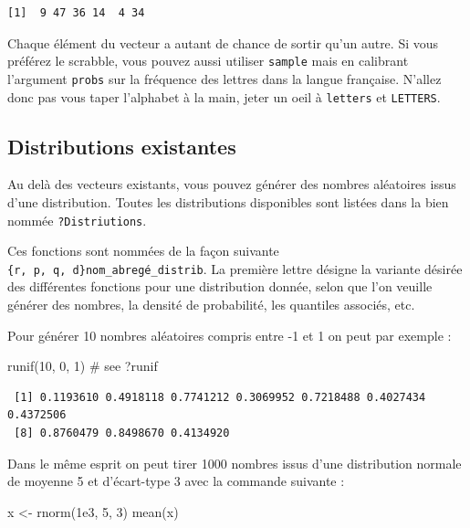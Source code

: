 \documentclass[
  letterpaper,
  DIV=11,
  numbers=noendperiod]{scrreprt}
\newenvironment{Shaded}{\begin{snugshade}}{\end{snugshade}}
\newcommand{\CommentTok}[1]{\textcolor[rgb]{0.37,0.37,0.37}{#1}}
\newcommand{\DecValTok}[1]{\textcolor[rgb]{0.68,0.00,0.00}{#1}}
\newcommand{\FloatTok}[1]{\textcolor[rgb]{0.68,0.00,0.00}{#1}}
\newcommand{\FunctionTok}[1]{\textcolor[rgb]{0.28,0.35,0.67}{#1}}
\newcommand{\NormalTok}[1]{\textcolor[rgb]{0.00,0.23,0.31}{#1}}
\newcommand{\OtherTok}[1]{\textcolor[rgb]{0.00,0.23,0.31}{#1}}
\begin{document}
\begin{verbatim}
[1]  9 47 36 14  4 34
\end{verbatim}

Chaque élément du vecteur a autant de chance de sortir qu'un autre. Si
vous préférez le scrabble, vous pouvez aussi utiliser \texttt{sample}
mais en calibrant l'argument \texttt{probs} sur la fréquence des lettres
dans la langue française. N'allez donc pas vous taper l'alphabet à la
main, jeter un oeil à \texttt{letters} et \texttt{LETTERS}.

\hypertarget{distributions-existantes}{%
\subsection{Distributions existantes}\label{distributions-existantes}}

Au delà des vecteurs existants, vous pouvez générer des nombres
aléatoires issus d'une distribution. Toutes les distributions
disponibles sont listées dans la bien nommée \texttt{?Distriutions}.

Ces fonctions sont nommées de la façon suivante
\texttt{\{r,\ p,\ q,\ d\}nom\_abregé\_distrib}. La première lettre
désigne la variante désirée des différentes fonctions pour une
distribution donnée, selon que l'on veuille générer des nombres, la
densité de probabilité, les quantiles associés, etc.

Pour générer 10 nombres aléatoires compris entre -1 et 1 on peut par
exemple :

\begin{Shaded}
\begin{Highlighting}[]
\FunctionTok{runif}\NormalTok{(}\DecValTok{10}\NormalTok{, }\DecValTok{0}\NormalTok{, }\DecValTok{1}\NormalTok{) }\CommentTok{\# see ?runif}
\end{Highlighting}
\end{Shaded}

\begin{verbatim}
 [1] 0.1193610 0.4918118 0.7741212 0.3069952 0.7218488 0.4027434 0.4372506
 [8] 0.8760479 0.8498670 0.4134920
\end{verbatim}

Dans le même esprit on peut tirer 1000 nombres issus d'une distribution
normale de moyenne 5 et d'écart-type 3 avec la commande suivante :

\begin{Shaded}
\begin{Highlighting}[]
\NormalTok{x }\OtherTok{\textless{}{-}} \FunctionTok{rnorm}\NormalTok{(}\FloatTok{1e3}\NormalTok{, }\DecValTok{5}\NormalTok{, }\DecValTok{3}\NormalTok{)}
\FunctionTok{mean}\NormalTok{(x)}
\end{Highlighting}
\end{Shaded}
\end{document}
